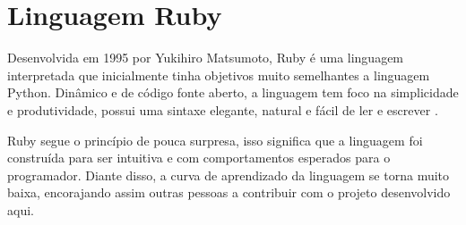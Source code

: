 \section{Linguagem Ruby}
Desenvolvida em 1995 por Yukihiro Matsumoto, Ruby é uma linguagem interpretada que inicialmente tinha objetivos muito semelhantes a linguagem Python\cite{purer2009phpvspythonvsruby}. Dinâmico e de código fonte aberto, a linguagem tem foco na simplicidade e produtividade, possui uma sintaxe elegante, natural e fácil de ler e escrever \cite{siteruby}. \par
Ruby segue o princípio de pouca surpresa, isso significa que a linguagem foi construída para ser intuitiva e com comportamentos esperados para o programador\cite{purer2009phpvspythonvsruby}. Diante disso, a curva de aprendizado da linguagem se torna muito baixa, encorajando assim outras pessoas a contribuir com o projeto desenvolvido aqui.









